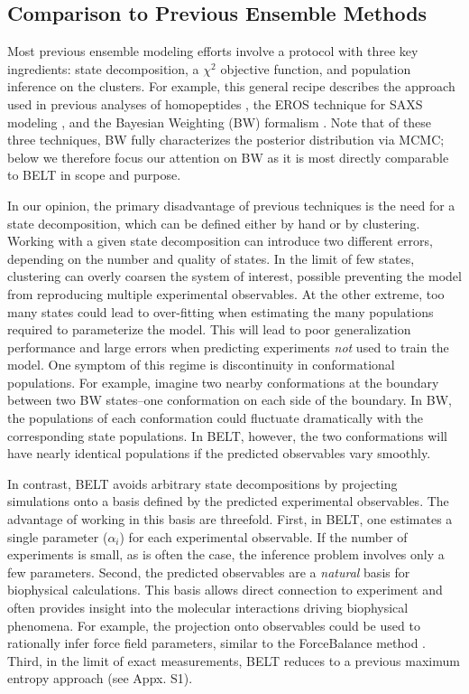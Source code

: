 \documentclass[11pt,titlepage]{article}
\begin{document}
\subsection*{Comparison to Previous Ensemble Methods}

Most previous ensemble modeling efforts involve a protocol with three key ingredients: state decomposition, a $\chi^2$ objective function, and population inference on the clusters.  For example, this general recipe describes the approach used in previous analyses of homopeptides \citep{Graf2007}, the EROS technique for SAXS modeling \citep{rozycki2011saxs}, and the Bayesian Weighting (BW) formalism \citep{fisher2010}.  Note that of these three techniques, BW fully characterizes the posterior distribution via MCMC; below we therefore focus our attention on BW as it is most directly comparable to BELT in scope and purpose.

In our opinion, the primary disadvantage of previous techniques is the need for a state decomposition, which can be defined either by hand or by clustering.  Working with a given state decomposition can introduce two different errors, depending on the number  and quality of states.  In the limit of few states, clustering can overly coarsen the system of interest, possible preventing the model from reproducing multiple experimental observables.  At the other extreme, too many states could lead to over-fitting when estimating the many populations required to parameterize the model.  This will lead to poor generalization performance and large errors when predicting experiments \emph{not} used to train the model.  One symptom of this regime is discontinuity in conformational populations. For example, imagine two nearby conformations at the boundary between two BW states--one conformation on each side of the boundary.  In BW, the populations of each conformation could fluctuate dramatically with the corresponding 
state populations.  In BELT, however, the two conformations will have nearly identical populations if the predicted observables vary smoothly.

In contrast, BELT avoids arbitrary state decompositions by projecting simulations onto a basis defined by the predicted experimental observables.  The advantage of working in this basis are threefold. First, in BELT, one estimates a single parameter ($\alpha_i$) for each experimental observable.  If the number of experiments is small, as is often the case, the inference problem involves only a few parameters.  Second, the predicted observables are a \emph{natural} basis for biophysical calculations.  This basis allows direct connection to experiment and often provides insight into the molecular interactions driving biophysical phenomena.  For example, the projection onto observables could be used to rationally infer force field parameters, similar to the ForceBalance method \citep{wang2012, wang2013systematic}.  Third, in the limit of exact measurements, BELT reduces to a previous \citep{chodera2012} maximum entropy approach (see Appx. S1).  
\end{document}
